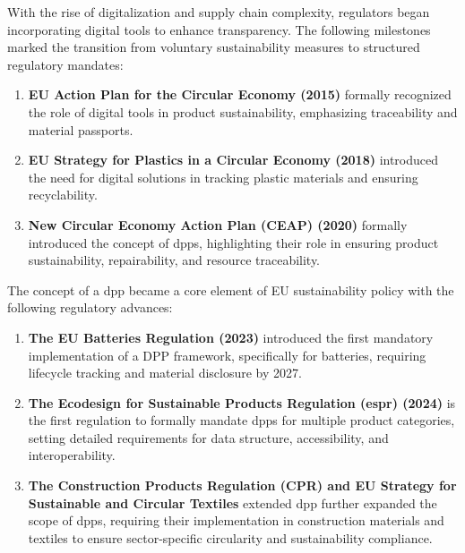 With the rise of digitalization and supply chain complexity, regulators began incorporating digital tools to enhance transparency. The following milestones marked the transition from voluntary sustainability measures to structured regulatory mandates:

\begin{enumerate}[itemsep=0.5\baselineskip]
    \item \textbf{EU Action Plan for the Circular Economy (2015)} formally recognized the role of digital tools in product sustainability, emphasizing traceability and material passports. \autocite{EuropeanCommission.2015}
    
    \item \textbf{EU Strategy for Plastics in a Circular Economy (2018)} introduced the need for digital solutions in tracking plastic materials and ensuring recyclability. \autocite{EuropeanCommission.2018}
    
    \item \textbf{New Circular Economy Action Plan (CEAP) (2020)} formally introduced the concept of \ac{dpp}s, highlighting their role in ensuring product sustainability, repairability, and resource traceability. \autocite{EuropeanCommission.2020}
\end{enumerate}

The concept of a \acrlong{dpp} became a core element of EU sustainability policy with the following regulatory advances:

\begin{enumerate}[itemsep=0.5\baselineskip]
    \item \textbf{The EU Batteries Regulation (2023)} introduced the first mandatory implementation of a DPP framework, specifically for batteries, requiring lifecycle tracking and material disclosure by 2027. \autocite{Urban.2024}
    
    \item \textbf{The Ecodesign for Sustainable Products Regulation (\ac{espr}) (2024)} is the first regulation to formally mandate \ac{dpp}s for multiple product categories, setting detailed requirements for data structure, accessibility, and interoperability. \autocite{EuropeanParliamentandCouncil.2024}
    
    \item \textbf{The Construction Products Regulation (CPR) and EU Strategy for Sustainable and Circular Textiles} extended \ac{dpp} further expanded the scope of \ac{dpp}s, requiring their implementation in construction materials and textiles to ensure sector-specific circularity and sustainability compliance. \autocite{Wautelet.2024}
\end{enumerate}

